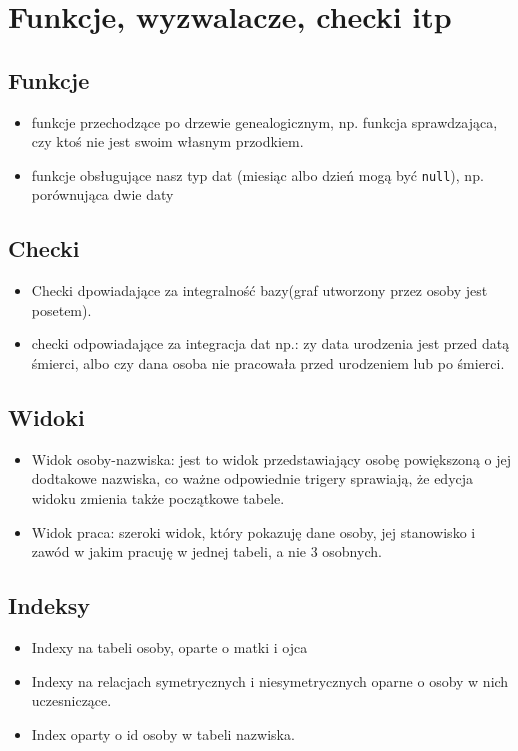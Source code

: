 \documentclass{article}
\begin{document}
\section{Funkcje, wyzwalacze, checki itp}

\subsection{Funkcje}
\begin{itemize}
\item funkcje przechodzące po drzewie genealogicznym, np. funkcja sprawdzająca, czy ktoś nie jest swoim własnym przodkiem.
\item funkcje obsługujące nasz typ dat (miesiąc albo dzień mogą być \texttt{null}), np. porównująca dwie daty
\end{itemize}

\subsection{Checki}

\begin{itemize}
\item Checki dpowiadające za integralność bazy(graf utworzony przez osoby jest posetem).
\item checki odpowiadające za integracja dat np.: zy data urodzenia jest przed datą śmierci, albo czy dana osoba nie pracowała przed urodzeniem lub po śmierci.
\end{itemize}
\subsection{Widoki}
\begin{itemize}
\item Widok osoby-nazwiska: jest to widok przedstawiający osobę powiększoną o jej dodtakowe nazwiska, co ważne odpowiednie trigery sprawiają, że edycja widoku zmienia także początkowe tabele.
\item Widok praca: szeroki widok, który pokazuję dane osoby, jej stanowisko i zawód w jakim pracuję w jednej tabeli, a nie 3 osobnych.
\end{itemize}
\subsection{Indeksy}
\begin{itemize}
\item Indexy na tabeli osoby, oparte o matki i ojca 
\item Indexy na relacjach symetrycznych i niesymetrycznych oparne o osoby w nich uczesniczące.
\item Index oparty o id osoby w tabeli nazwiska.
\end{itemize}
\end{document}
